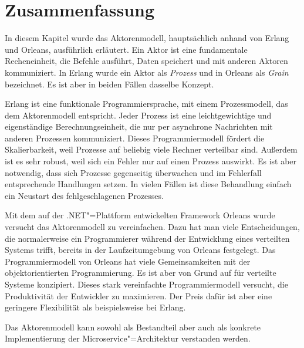\section{Zusammenfassung}

In diesem Kapitel wurde das Aktorenmodell, hauptsächlich anhand von \mbox{Erlang} und Orleans, ausführlich erläutert. Ein Aktor ist eine fundamentale Recheneinheit, die Befehle ausführt, Daten speichert und mit anderen Aktoren kommuniziert. In Erlang wurde ein Aktor als \textit{Prozess} und in Orleans als \textit{Grain} bezeichnet. Es ist aber in beiden Fällen dasselbe Konzept.

Erlang ist eine funktionale Programmiersprache, mit einem Prozessmodell, das dem Aktorenmodell entspricht. Jeder Prozess ist eine leichtgewichtige und eigenständige Berechnungseinheit, die nur per asynchrone Nachrichten mit anderen Prozessen kommuniziert. Dieses Programmiermodell fördert die Skalierbarkeit, weil Prozesse auf beliebig viele Rechner verteilbar sind. Außerdem ist es sehr robust, weil sich ein Fehler nur auf einen Prozess auswirkt. Es ist aber notwendig, dass sich Prozesse gegenseitig überwachen und im Fehlerfall entsprechende Handlungen setzen. In vielen Fällen ist diese Behandlung einfach ein Neustart des fehlgeschlagenen Prozesses.

Mit dem auf der .NET"=Plattform entwickelten Framework Orleans wurde versucht das Aktorenmodell zu vereinfachen. Dazu hat man viele Entscheidungen, die normalerweise ein Programmierer während der Entwicklung eines verteilten Systems trifft, bereits in der Laufzeitumgebung von Orleans festgelegt. Das Programmiermodell von Orleans hat viele Gemeinsamkeiten mit der objektorientierten Programmierung. Es ist aber von Grund auf für verteilte Systeme konzipiert. Dieses stark vereinfachte Programmiermodell versucht, die Produktivität der Entwickler zu maximieren. Der Preis dafür ist aber eine geringere Flexibilität als beispielsweise bei Erlang.

Das Aktorenmodell kann sowohl als Bestandteil aber auch als konkrete Implementierung der Microservice"=Architektur verstanden werden.